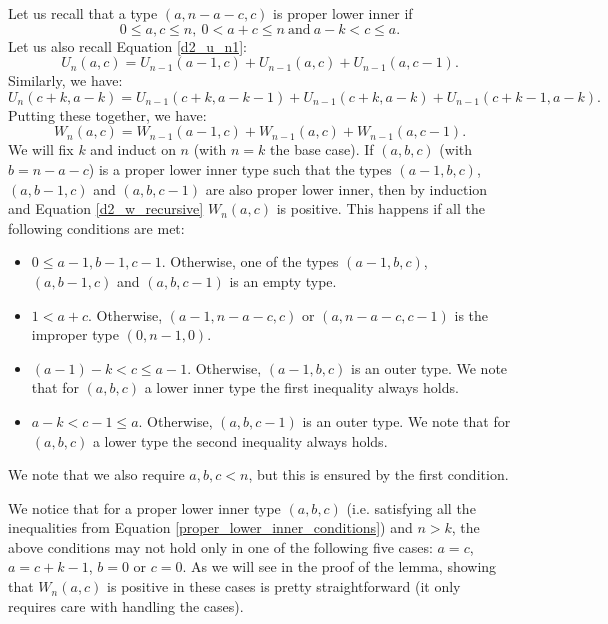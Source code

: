 \documentclass[11pt, reqno]{amsart}
\theoremstyle{remark}
\numberwithin{equation}{section}
\newcommand{\wn}{W_{n}}
\newcommand{\wno}{W_{n-1}}
\newcommand{\un}{U_{n}}
\newcommand{\uno}{U_{n-1}}
\begin{document}
Let us recall that a type $(a, n-a-c, c)$ is proper lower inner if
\begin{equation}
\label{proper_lower_inner_conditions}
    0 \leqslant a, c \leqslant n, \ 0<a+c\leqslant n \ \text{and} \ a-k<c\leqslant a.
\end{equation}
Let us also recall Equation \ref{d2_u_n1}:
\begin{equation*}
    U_n(a, c)=\uno(a-1, c) + \uno(a, c)+\uno(a, c-1).
\end{equation*}
Similarly, we have:
\begin{equation*}
    \un(c+k, a-k)=\uno(c+k, a-k-1)+\uno(c+k, a-k)+\uno(c+k-1, a-k).
\end{equation*}
Putting these together, we have:
\begin{equation}
\label{d2_w_recursive}
    W_n(a, c)=\wno(a-1, c)+\wno(a, c)+\wno(a, c-1).
\end{equation}
We will fix $k$ and induct on $n$ (with $n=k$ the base case). If $(a, b, c)$ (with $b=n-a-c$) is a proper lower inner type such that the types $(a-1, b, c)$, $(a, b-1, c)$ and $(a, b, c-1)$ are also proper lower inner, then by induction and Equation \ref{d2_w_recursive} $\wn(a, c)$ is positive. This happens if all the following conditions are met:
\begin{itemize}
    \item $0 \leqslant a-1, b-1, c-1$. Otherwise, one of the types $(a-1, b, c)$, $(a, b-1, c)$ and $(a, b, c-1)$ is an empty type.
    \item $1 < a+c$. Otherwise, $(a-1, n-a-c, c)$ or $(a, n-a-c, c-1)$ is the improper type $(0, n-1, 0)$.
    \item $(a-1)-k < c \leqslant a-1$. Otherwise, $(a-1, b, c)$ is an outer type. We note that for $(a, b, c)$ a lower inner type the first inequality always holds.
    \item $a-k < c-1 \leqslant a$. Otherwise, $(a, b, c-1)$ is an outer type. We note that for $(a, b, c)$ a lower type the second inequality always holds.
\end{itemize}
We note that we also require $a, b, c < n$, but this is ensured by the first condition.

We notice that for a proper lower inner type $(a, b, c)$ (i.e. satisfying all the inequalities from Equation \ref{proper_lower_inner_conditions}) and $n>k$, the above conditions may not hold only in one of the following five cases: $a=c$, $a=c+k-1$, $b=0$ or $c=0$. As we will see in the proof of the lemma, showing that $\wn(a, c)$ is positive in these cases is pretty straightforward (it only requires care with handling the cases).
\end{document}
